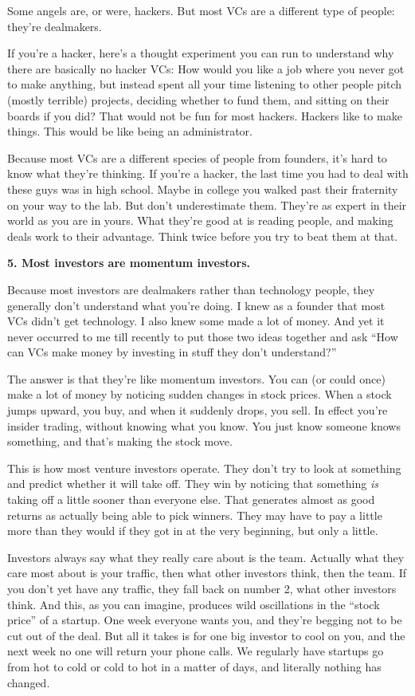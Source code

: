 Some angels are, or were, hackers. But most VCs are a different type of
people: they're dealmakers.

If you're a hacker, here's a thought experiment you can run to
understand why there are basically no hacker VCs: How would you like a
job where you never got to make anything, but instead spent all your
time listening to other people pitch (mostly terrible) projects,
deciding whether to fund them, and sitting on their boards if you did?
That would not be fun for most hackers. Hackers like to make things.
This would be like being an administrator.

Because most VCs are a different species of people from founders, it's
hard to know what they're thinking. If you're a hacker, the last time
you had to deal with these guys was in high school. Maybe in college you
walked past their fraternity on your way to the lab. But don't
underestimate them. They're as expert in their world as you are in
yours. What they're good at is reading people, and making deals work to
their advantage. Think twice before you try to beat them at that.

\textbf{5. Most investors are momentum investors.}

Because most investors are dealmakers rather than technology people,
they generally don't understand what you're doing. I knew as a founder
that most VCs didn't get technology. I also knew some made a lot of
money. And yet it never occurred to me till recently to put those two
ideas together and ask ``How can VCs make money by investing in stuff
they don't understand?''

The answer is that they're like momentum investors. You can (or could
once) make a lot of money by noticing sudden changes in stock prices.
When a stock jumps upward, you buy, and when it suddenly drops, you
sell. In effect you're insider trading, without knowing what you know.
You just know someone knows something, and that's making the stock move.

This is how most venture investors operate. They don't try to look at
something and predict whether it will take off. They win by noticing
that something \emph{is} taking off a little sooner than everyone else.
That generates almost as good returns as actually being able to pick
winners. They may have to pay a little more than they would if they got
in at the very beginning, but only a little.

Investors always say what they really care about is the team. Actually
what they care most about is your traffic, then what other investors
think, then the team. If you don't yet have any traffic, they fall back
on number 2, what other investors think. And this, as you can imagine,
produces wild oscillations in the ``stock price'' of a startup. One week
everyone wants you, and they're begging not to be cut out of the deal.
But all it takes is for one big investor to cool on you, and the next
week no one will return your phone calls. We regularly have startups go
from hot to cold or cold to hot in a matter of days, and literally
nothing has changed.

